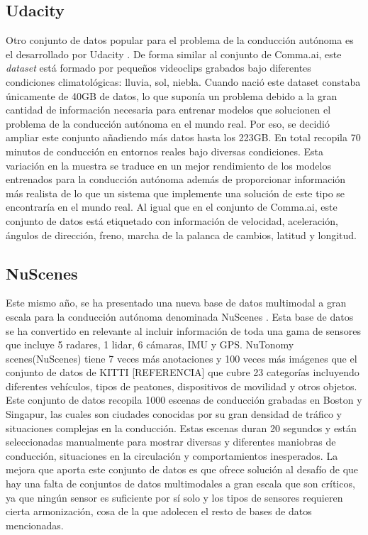 \subsection{Udacity}

Otro conjunto de datos popular para el problema de la conducción autónoma es el desarrollado por Udacity \cite{udacity-data}. De forma similar al conjunto de Comma.ai, este \textit{dataset} está formado por pequeños videoclips grabados bajo diferentes condiciones climatológicas: lluvia, sol, niebla.  Cuando nació este dataset constaba únicamente de 40GB de datos, lo que suponía un problema debido a la gran cantidad de información necesaria para entrenar modelos que solucionen el problema de la conducción autónoma en el mundo real. Por eso, se decidió ampliar este conjunto añadiendo más datos hasta los 223GB. En total recopila 70 minutos de conducción en entornos reales bajo diversas condiciones. Esta variación en la muestra se traduce en un mejor rendimiento de los modelos entrenados para la conducción autónoma además de proporcionar información más realista de lo que un sistema que implemente una solución de este tipo se encontraría en el mundo real. Al igual que en el conjunto de Comma.ai, este conjunto de datos está etiquetado con información de velocidad, aceleración, ángulos de dirección, freno, marcha de la palanca de cambios, latitud y longitud.

\subsection {NuScenes}

Este mismo año, se ha presentado una nueva base de datos multimodal a gran escala para la conducción autónoma denominada NuScenes \cite{nuscenes-dataset}. Esta base de datos se ha convertido en relevante al incluir información de toda una gama de sensores que incluye 5 radares, 1 lidar, 6 cámaras, IMU y GPS. NuTonomy scenes(NuScenes) tiene 7 veces más anotaciones y 100 veces más imágenes que el conjunto de datos de KITTI [REFERENCIA] que cubre 23 categorías incluyendo diferentes vehículos, tipos de peatones, dispositivos de movilidad y otros objetos.
Este conjunto de datos recopila 1000 escenas de conducción grabadas en Boston y Singapur, las cuales son ciudades conocidas por su gran densidad de tráfico y situaciones complejas en la conducción. Estas escenas duran 20 segundos y están seleccionadas manualmente para mostrar diversas y diferentes maniobras de conducción, situaciones en la circulación y comportamientos inesperados.
La mejora que aporta este conjunto de datos es que ofrece solución al desafío de que hay una falta de conjuntos de datos multimodales a gran escala que son críticos, ya que ningún sensor es suficiente por sí solo y los tipos de sensores requieren cierta armonización, cosa de la que adolecen el resto de bases de datos mencionadas.

